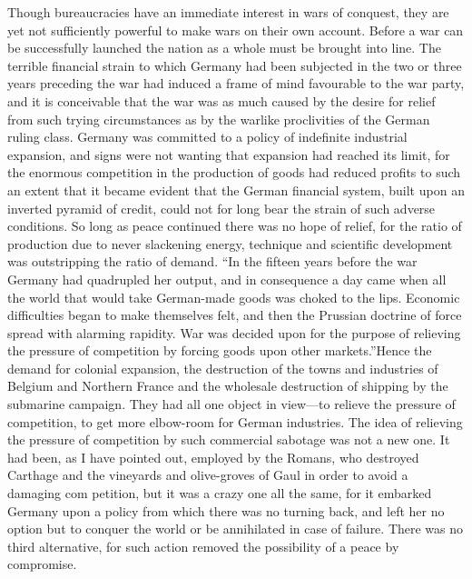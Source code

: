 \documentclass{book}
\begin{document}
Though bureaucracies have an immediate interest in wars of conquest, they are yet not sufficiently powerful to make wars on their own account. Before a war can be successfully launched the nation as a whole must be brought into line. The terrible financial strain to which Germany had been subjected in the two or three years preceding the war had induced a frame of mind favourable to the war party, and it is conceivable that the war was as much caused by the desire for relief from such trying circumstances as by the warlike proclivities of the German ruling class. Germany was committed to a policy of indefinite industrial expansion, and signs were not wanting that expansion had reached its limit, for the enormous competition in the production of goods had reduced profits to such an extent that it became evident that the German financial system, built upon an inverted pyramid of credit, could not for long bear the strain of such adverse conditions. So long as peace continued there was no hope of relief, for the ratio of production due to never slackening energy, technique and scientific development was outstripping the ratio of demand. “In the fifteen years before the war Germany had quadrupled her output, and in consequence a day came when all the world that would take German-made goods was choked to the lips. Economic difficulties began to make themselves felt, and then the Prussian doctrine of force spread with alarming rapidity. War was decided upon for the purpose of relieving the pressure of competition by forcing goods upon other markets.”\footnotemark[4] Hence the demand for colonial expansion, the destruction of the towns and industries of Belgium and Northern France and the wholesale destruction of shipping by the submarine campaign. They had all one object in view—to relieve the pressure of competition, to get more elbow-room for German industries. The idea of relieving the pressure of competition by such commercial sabotage was not a new one. It had been, as I have pointed out, employed by the Romans, who destroyed Carthage and the vineyards and olive-groves of Gaul in order to avoid a damaging com petition, but it was a crazy one all the same, for it embarked Germany upon a policy from which there was no turning back, and left her no option but to conquer the world or be annihilated in case of failure. There was no third alternative, for such action removed the possibility of a peace by compromise.
\end{document}
